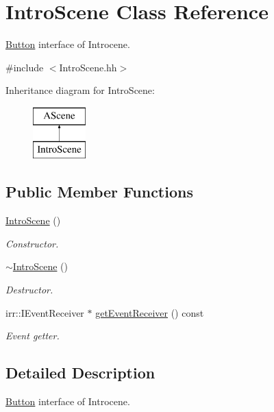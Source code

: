 \hypertarget{classIntroScene}{}\section{Intro\+Scene Class Reference}
\label{classIntroScene}


\hyperlink{classButton}{Button} interface of Introcene.  




{\ttfamily \#include $<$Intro\+Scene.\+hh$>$}

Inheritance diagram for Intro\+Scene\+:\begin{figure}[H]
\begin{center}
\leavevmode
\includegraphics[height=2.000000cm]{classIntroScene}
\end{center}
\end{figure}
\subsection*{Public Member Functions}
\begin{DoxyCompactItemize}
\item 
\hyperlink{classIntroScene_a3691b51409f65b40f0c84008e49ef32b}{Intro\+Scene} ()
\begin{DoxyCompactList}\small\item\em Constructor. \end{DoxyCompactList}\item 
\hyperlink{classIntroScene_a7cdb50b55c0f5cf66b7bd151e4abe2b1}{$\sim$\+Intro\+Scene} ()
\begin{DoxyCompactList}\small\item\em Destructor. \end{DoxyCompactList}\item 
irr\+::\+I\+Event\+Receiver $\ast$ \hyperlink{classIntroScene_acabf925dab7b2a346edd398445cd5800}{get\+Event\+Receiver} () const
\begin{DoxyCompactList}\small\item\em Event getter. \end{DoxyCompactList}\end{DoxyCompactItemize}


\subsection{Detailed Description}
\hyperlink{classButton}{Button} interface of Introcene. 

